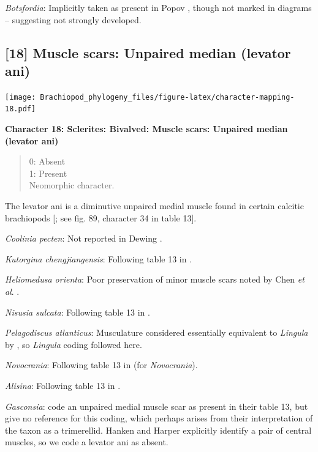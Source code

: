 \documentclass[openany]{book}
\theoremstyle{definition}
\theoremstyle{definition}
\theoremstyle{definition}
\theoremstyle{remark}
\begin{document}
\emph{Botsfordia}: Implicitly taken as present in Popov
\citeyearpar{Popov1992TheCambrian}, though not marked in diagrams --
suggesting not strongly developed.

\hypertarget{muscle-scars-unpaired-median-levator-ani}{%
\subsection*{{[}18{]} Muscle scars: Unpaired median (levator
ani)}\label{muscle-scars-unpaired-median-levator-ani}}

\texttt{[image: Brachiopod\_phylogeny\_files/figure-latex/character-mapping-18.pdf]}

\textbf{Character 18: Sclerites: Bivalved: Muscle scars: Unpaired median
(levator ani)}

\begin{quote}
0: Absent\\
1: Present\\
Neomorphic character.
\end{quote}

The levator ani is a diminutive unpaired medial muscle found in certain
calcitic brachiopods {[}\citet{Williams2000BrachiopodaLinguliformea};
see fig. 89, character 34 in table 13{]}.

\emph{Coolinia pecten}: Not reported in Dewing
\citeyearpar{Dewing2001Hingemodifications}.

\emph{Kutorgina chengjiangensis}: Following table 13 in
\citet{Williams2000BrachiopodaLinguliformea}.

\emph{Heliomedusa orienta}: Poor preservation of minor muscle scars
noted by Chen \emph{et al}. \citeyearpar{Chen2007Reinterpretationof}.

\emph{Nisusia sulcata}: Following table 13 in
\citet{Williams2000BrachiopodaLinguliformea}.

\emph{Pelagodiscus atlanticus}: Musculature considered essentially
equivalent to \emph{Lingula} by
\citet{Williams2000BrachiopodaLinguliformea}, so \emph{Lingula} coding
followed here.

\emph{Novocrania}: Following table 13 in
\citet{Williams2000BrachiopodaLinguliformea} (for \emph{Novocrania}).

\emph{Alisina}: Following table 13 in
\citet{Williams2000BrachiopodaLinguliformea}.

\emph{Gasconsia}: \citet{Williams2000BrachiopodaLinguliformea} code an
unpaired medial muscle scar as present in their table 13, but give no
reference for this coding, which perhaps arises from their
interpretation of the taxon as a trimerellid. Hanken and Harper
\citeyearpar[p.~249 and text-fig. 2]{Hanken1985Thetaxonomy} explicitly
identify a pair of central muscles, so we code a levator ani as absent.
\end{document}
